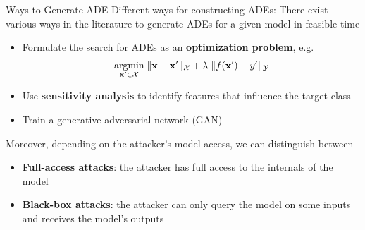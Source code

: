 \documentclass[11pt,compress,t,notes=noshow, aspectratio=169, xcolor=table]{beamer}
\begin{document}
\begin{vbframe}[c]{Ways to Generate ADE}
Different ways for constructing ADEs:
There exist various ways in the literature to generate ADEs for a given model in feasible time
\begin{itemize}
    \item Formulate the search for ADEs as an \textbf{optimization problem}, e.g. 
    \begin{equation*}
        \label{eq:optimization}
        \underset{\xv'\in \Xspace}{\text{argmin}}\; \| \xv-\xv' \|_{\Xspace} + \lambda\;    \|f(\xv')-y'\|_{\Yspace}
    \end{equation*}
    \item Use \textbf{sensitivity analysis} to identify features that influence the target class
    \item Train a generative adversarial network (GAN) 
\end{itemize}
Moreover, depending on the attacker's model access, we can distinguish between
\begin{itemize}
    \item \textbf{Full-access attacks}: the attacker has full access to the internals of the model
    \item \textbf{Black-box attacks}: the attacker can only query the model on some inputs and receives the model's outputs
\end{itemize}
\end{vbframe}
\end{document}
